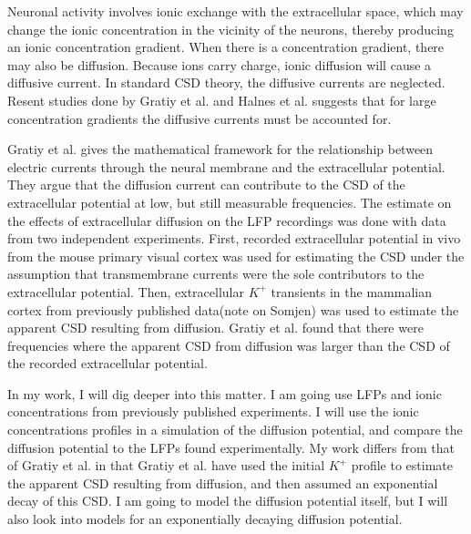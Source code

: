 \documentclass{article}
\begin{document}
Neuronal activity involves ionic exchange with the extracellular space, which may change the ionic concentration in the vicinity of the neurons, thereby producing an ionic concentration gradient. When there is a concentration gradient, there may also be diffusion. Because ions carry charge, ionic diffusion will cause a diffusive current. In standard CSD theory, the diffusive currents are neglected. Resent studies done by Gratiy et al. and Halnes et al. suggests that for large concentration gradients the diffusive currents must be accounted for. 

Gratiy et al.\cite{Gratiy2017} gives the mathematical framework for the relationship between electric currents through the neural membrane and the extracellular potential. They argue that the diffusion current can contribute to the CSD of the extracellular potential at low, but still measurable frequencies. The estimate on the effects of extracellular diffusion on the LFP recordings was done with data from two independent experiments. First, recorded extracellular potential in vivo from the mouse primary visual cortex was used for estimating the CSD under the assumption that transmembrane currents were the sole contributors to the extracellular potential. Then, extracellular $K^+$ transients in the mammalian cortex from previously published data(note on Somjen) was used to estimate the apparent CSD resulting from diffusion. Gratiy et al. found that there were frequencies where the apparent CSD from diffusion was larger than the CSD of the recorded extracellular potential.

In my work, I will dig deeper into this matter. I am going use LFPs and ionic concentrations from previously published experiments. I will use the ionic concentrations profiles in a simulation of the diffusion potential, and compare the diffusion potential to the LFPs found experimentally. My work differs from that of Gratiy et al. in that Gratiy et al. have used the initial $K^+$ profile to estimate the apparent CSD resulting from diffusion, and then assumed an exponential decay of this CSD. I am going to model the diffusion potential itself, but I will also look into models for an exponentially decaying diffusion potential. 
\end{document}
